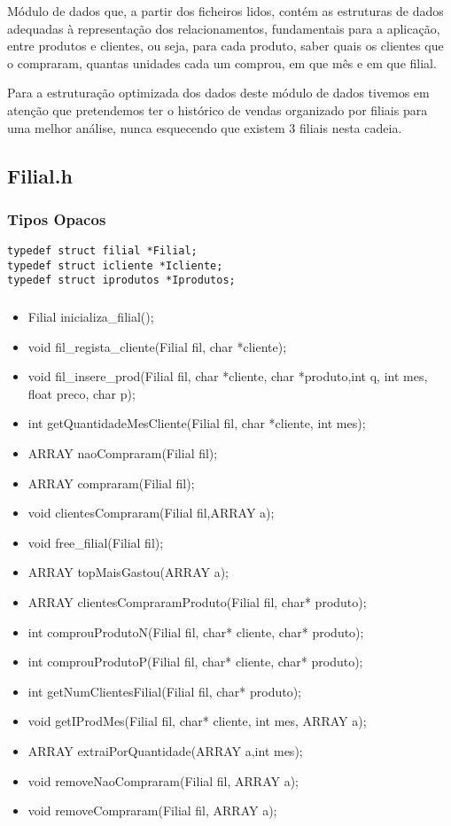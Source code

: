 Módulo de dados que, a partir dos ficheiros lidos, contém as estruturas de dados adequadas à representação dos relacionamentos, fundamentais para a aplicação, entre produtos e clientes, ou seja, para cada produto, saber quais os clientes que o compraram, quantas unidades cada um comprou, em que mês e em que filial.

 Para a estruturação optimizada dos dados deste módulo de dados tivemos em atenção que pretendemos ter o histórico de vendas organizado por filiais para uma melhor análise, nunca esquecendo que existem 3 filiais nesta cadeia. 

\subsection{Filial.h}

\subsubsection{Tipos Opacos}
\begin{Verbatim}
typedef struct filial *Filial;
typedef struct icliente *Icliente;
typedef struct iprodutos *Iprodutos;
\end{Verbatim}

\subsubsection{}

\begin{itemize}
\item	Filial inicializa\_filial();
\item	void fil\_regista\_cliente(Filial fil, char *cliente);
\item	void fil\_insere\_prod(Filial fil, char *cliente, char *produto,int q, int mes, float preco, char p);
\item	int getQuantidadeMesCliente(Filial fil, char *cliente, int mes);
\item	ARRAY naoCompraram(Filial fil);
\item	ARRAY compraram(Filial fil);
\item	void clientesCompraram(Filial fil,ARRAY a);
\item	void free\_filial(Filial fil);
\item	ARRAY topMaisGastou(ARRAY a);
\item	ARRAY clientesCompraramProduto(Filial fil, char* produto);
\item	int comprouProdutoN(Filial fil, char* cliente, char* produto);
\item	int comprouProdutoP(Filial fil, char* cliente, char* produto);
\item	int getNumClientesFilial(Filial fil, char* produto);
\item	void getIProdMes(Filial fil, char* cliente, int mes, ARRAY a);
\item	ARRAY extraiPorQuantidade(ARRAY a,int mes);
\item	void removeNaoCompraram(Filial fil, ARRAY a);
\item	void removeCompraram(Filial fil, ARRAY a);
\end{itemize}


